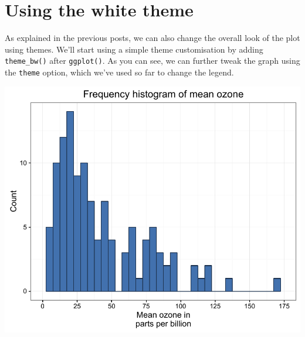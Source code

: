 \section{Using the white theme}\label{using-the-white-theme}

As explained in the previous posts, we can also change the overall look
of the plot using themes. We'll start using a simple theme customisation
by adding \texttt{theme\_bw()} after \texttt{ggplot()}. As you can see,
we can further tweak the graph using the \texttt{theme} option, which
we've used so far to change the legend.

\begin{Shaded}
\begin{Highlighting}[]
\StringTok{ }\NormalTok{(} \StringTok{ }
\StringTok{  }\NormalTok{(}\NormalTok{(}  \NormalTok{,}
    
\StringTok{    }\NormalTok{(} \NormalTok{,}
     \NormalTok{(}\NormalTok{, }\NormalTok{, }\NormalTok{),}
    \NormalTok{(}\NormalTok{, }\NormalTok{)) +}
\StringTok{    }\NormalTok{(} \NormalTok{) +}
\StringTok{  }\NormalTok{(}\NormalTok{) +}
\StringTok{  }\NormalTok{()}
\end{Highlighting}
\end{Shaded}

\begin{center}\includegraphics[width=0.6\linewidth]{7_Histograms_pdf/histogram_13-1} \end{center}

